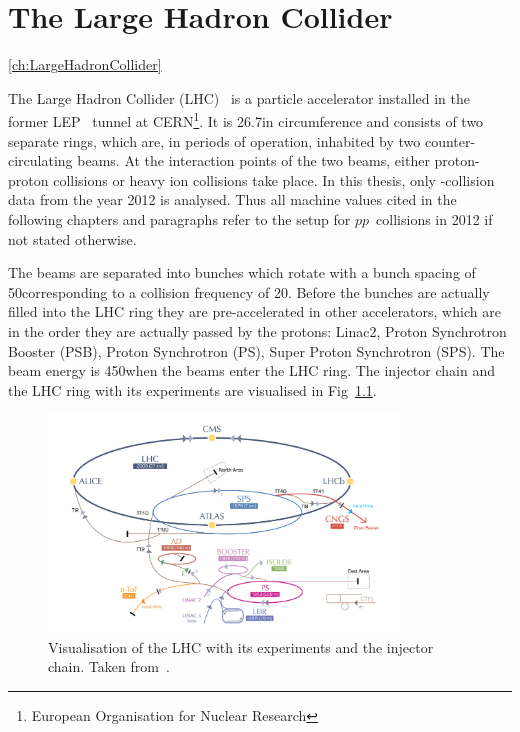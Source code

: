 \chapter{The Large Hadron Collider}
\ref{ch:LargeHadronCollider}

The Large Hadron Collider (LHC)~\cite{bib:LHC_machine_2008,bib:LHC_2004} is a particle accelerator installed in the former LEP~\cite{bib:LEP_design_1984} tunnel at CERN\footnote{European Organisation for Nuclear Research}.
It is 26.7\km in circumference and consists of two separate rings, which are, in periods of operation, inhabited by two counter-circulating beams.
At the interaction points of the two beams, either proton-proton collisions or heavy ion collisions take place.
In this thesis, only \pp-collision data from the year 2012 is analysed.
Thus all machine values cited in the following chapters and paragraphs refer to the setup for $pp$~collisions in 2012 if not stated otherwise.

The beams are separated into bunches which rotate with a bunch spacing of 50\ns corresponding to a collision frequency of 20\mhz.
Before the bunches are actually filled into the LHC ring they are pre-accelerated in other accelerators, which are in the order they are actually passed by the protons: Linac2, Proton  Synchrotron Booster (PSB), Proton Synchrotron (PS), Super Proton Synchrotron (SPS).
The beam energy is 450\gev when the beams enter the LHC ring.
The injector chain and the LHC ring with its experiments are visualised in Fig~\ref{fig:LHC}.
\begin{figure}[!b]
  \centering
      \includegraphics[width=0.83\textwidth]{figures/experiment/LHC/LHC_small.png}
  \caption{Visualisation of the LHC with its experiments and the injector chain. Taken from~\cite{bib:CERNBrochure}.}  
  \label{fig:LHC}
\end{figure}

